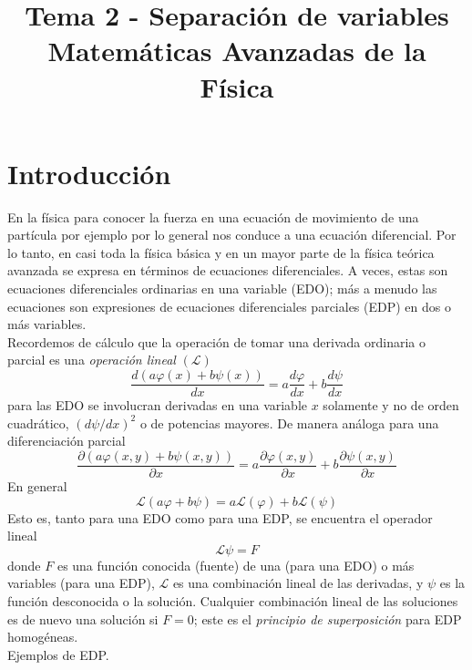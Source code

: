 
\title{Tema 2 - Separación de variables \\ {\large Matemáticas Avanzadas de la Física}}
\date{ }

\renewcommand\labelenumii{\theenumi.{\arabic{enumii}}}
\maketitle
\fontsize{14}{14}\selectfont
\section{Introducción}
En la física para conocer la fuerza en una ecuación de movimiento de una partícula por ejemplo por lo general nos conduce a una ecuación diferencial. Por lo tanto, en casi toda la física  básica y en un mayor parte de la física teórica avanzada se expresa en términos de ecuaciones diferenciales. A veces, estas son ecuaciones diferenciales ordinarias en una variable (EDO); más a menudo las ecuaciones son expresiones de ecuaciones diferenciales parciales (EDP) en dos o más variables.
\\
Recordemos de cálculo que la operación de tomar una derivada ordinaria o parcial es una \emph{operación lineal} $(\mathcal{L})$
\[ \dfrac{d(a \varphi(x) + b \psi (x))}{dx} = a\dfrac{d \varphi}{dx} +  b\dfrac{d \psi}{dx} \]
para las EDO se involucran derivadas en una variable $x$ solamente y no de orden cuadrático, $(d \psi / dx)^{2}$ o de potencias mayores. De manera análoga para una diferenciación parcial
\[ \dfrac{\partial ( a \varphi(x,y) + b \psi(x,y))}{\partial x} = a \dfrac{\partial \varphi(x,y)}{\partial x} + b \dfrac{\partial \psi(x,y)}{\partial x}  \]
En general
\[ \mathcal{L} (a \varphi +  b \psi ) = a \mathcal{L}(\varphi) +  b \mathcal{L} (\psi)  \]
Esto es, tanto para una EDO como para una EDP, se encuentra el operador lineal
\begin{equation}
\mathcal{L} \psi = F
\end{equation}
donde $F$ es una función conocida (fuente) de una (para una EDO) o más variables (para una EDP), $\mathcal{L}$ es una combinación lineal de las derivadas, y $\psi$ es la función desconocida o la  solución. Cualquier combinación lineal de las soluciones es de nuevo una solución si $F = 0$; este es el \emph{principio de superposición} para EDP homogéneas.
\\
Ejemplos de EDP.
